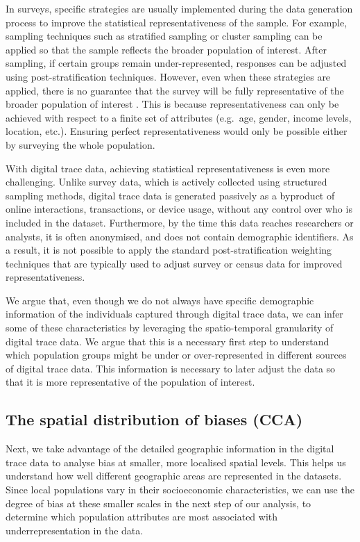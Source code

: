 \documentclass[]{rsos}%
\begin{document}
In surveys, specific strategies are usually implemented during the data
generation process to improve the statistical representativeness of the
sample. For example, sampling techniques such as stratified sampling or
cluster sampling can be applied so that the sample reflects the broader
population of interest. After sampling, if certain groups remain
under-represented, responses can be adjusted using post-stratification
techniques. However, even when these strategies are applied, there is no
guarantee that the survey will be fully representative of the broader
population of interest \citep{cochran1977sampling}. This is because
representativeness can only be achieved with respect to a finite set of
attributes (e.g.~age, gender, income levels, location, etc.). Ensuring
perfect representativeness would only be possible either by surveying
the whole population.

With digital trace data, achieving statistical representativeness is
even more challenging. Unlike survey data, which is actively collected
using structured sampling methods, digital trace data is generated
passively as a byproduct of online interactions, transactions, or device
usage, without any control over who is included in the dataset.
Furthermore, by the time this data reaches researchers or analysts, it
is often anonymised, and does not contain demographic identifiers. As a
result, it is not possible to apply the standard post-stratification
weighting techniques that are typically used to adjust survey or census
data for improved representativeness.

We argue that, even though we do not always have specific demographic
information of the individuals captured through digital trace data, we
can infer some of these characteristics by leveraging the
spatio-temporal granularity of digital trace data. We argue that this is
a necessary first step to understand which population groups might be
under or over-represented in different sources of digital trace data.
This information is necessary to later adjust the data so that it is
more representative of the population of interest.

\subsection{The spatial distribution of biases (CCA)}\label{the-spatial-distribution-of-biases-cca}

Next, we take advantage of the detailed geographic information in the
digital trace data to analyse bias at smaller, more localised spatial
levels. This helps us understand how well different geographic areas are
represented in the datasets. Since local populations vary in their
socioeconomic characteristics, we can use the degree of bias at these
smaller scales in the next step of our analysis, to determine which
population attributes are most associated with underrepresentation in
the data.
\end{document}

